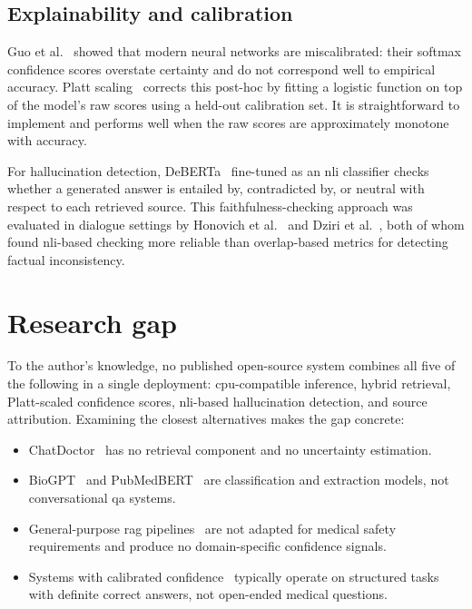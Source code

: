 \subsection{Explainability and calibration}

Guo et al.~\cite{guo2017calibration} showed that modern neural networks are miscalibrated: their softmax confidence scores overstate certainty and do not correspond well to empirical accuracy. Platt scaling~\cite{platt1999probabilistic} corrects this post-hoc by fitting a logistic function on top of the model's raw scores using a held-out calibration set. It is straightforward to implement and performs well when the raw scores are approximately monotone with accuracy.

For hallucination detection, DeBERTa~\cite{he2021deberta} fine-tuned as an \ac{nli} classifier checks whether a generated answer is entailed by, contradicted by, or neutral with respect to each retrieved source. This faithfulness-checking approach was evaluated in dialogue settings by Honovich et al.~\cite{honovich2022true} and Dziri et al.~\cite{dziri2022faithdial}, both of whom found \ac{nli}-based checking more reliable than overlap-based metrics for detecting factual inconsistency.

\section{Research gap}

To the author's knowledge, no published open-source system combines all five of the following in a single deployment: \ac{cpu}-compatible inference, hybrid retrieval, Platt-scaled confidence scores, \ac{nli}-based hallucination detection, and source attribution. Examining the closest alternatives makes the gap concrete:

\begin{itemize}
    \item ChatDoctor~\cite{li2023chatdoctor} has no retrieval component and no uncertainty estimation.
    \item BioGPT~\cite{luo2022biogpt} and PubMedBERT~\cite{gu2021pubmedbert} are classification and extraction models, not conversational \ac{qa} systems.
    \item General-purpose \ac{rag} pipelines~\cite{lewis2020rag} are not adapted for medical safety requirements and produce no domain-specific confidence signals.
    \item Systems with calibrated confidence~\cite{guo2017calibration} typically operate on structured tasks with definite correct answers, not open-ended medical questions.
\end{itemize}

